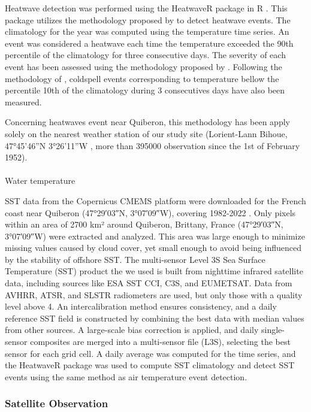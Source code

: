 \documentclass[
  number]{elsarticle}
\makeatletter
\let\oldparagraph\paragraph
\renewcommand{\paragraph}{
    \@ifstar
      \xxxParagraphStar
      \xxxParagraphNoStar
  }
\newcommand{\xxxParagraphStar}[1]{\oldparagraph*{#1}\mbox{}}
\newcommand{\xxxParagraphNoStar}[1]{\oldparagraph{#1}\mbox{}}
\makeatother
\begin{document}
Heatwave detection was performed using the HeatwaveR package in R
\citep{heatwaveR}. This package utilizes the methodology proposed by
\citep{hobday2016hierarchical} to detect heatwave events. The
climatology for the year was computed using the temperature time series.
An event was considered a heatwave each time the temperature exceeded
the 90th percentile of the climatology for three consecutive days. The
severity of each event has been assessed using the methodology proposed
by \citep{hobday2018categorizing}. Following the methodology of
\citep{schlegel2017nearshore}, coldspell events corresponding to
temperature bellow the percentile 10th of the climatology during 3
consecutives days have also been measured.

Concerning heatwaves event near Quiberon, this methodology has been
apply solely on the nearest weather station of our study site
(Lorient-Lann Bihoue, 47°45'46''N 3°26'11''W , more than 395000
observation since the 1st of February 1952).

\paragraph{Water temperature}\label{water-temperature}

SST data from the Copernicus CMEMS platform were downloaded for the
French coast near Quiberon (47°29′03″N, 3°07′09″W), covering 1982-2022
\citep{CMEMS_1}. Only pixels within an area of 2700 km² around Quiberon,
Brittany, France (47°29′03″N, 3°07′09″W) were extracted and analyzed.
This area was large enough to minimize missing values caused by cloud
cover, yet small enough to avoid being influenced by the stability of
offshore SST. The multi-sensor Level 3S Sea Surface Temperature (SST)
product the we used is built from nighttime infrared satellite data,
including sources like ESA SST CCI, C3S, and EUMETSAT. Data from AVHRR,
ATSR, and SLSTR radiometers are used, but only those with a quality
level above 4. An intercalibration method ensures consistency, and a
daily reference SST field is constructed by combining the best data with
median values from other sources. A large-scale bias correction is
applied, and daily single-sensor composites are merged into a
multi-sensor file (L3S), selecting the best sensor for each grid cell. A
daily average was computed for the time series, and the HeatwaveR
package \citep{heatwaveR} was used to compute SST climatology and detect
SST events using the same method as air temperature event detection.

\subsubsection{Satellite Observation}\label{satellite-observation}
\end{document}
